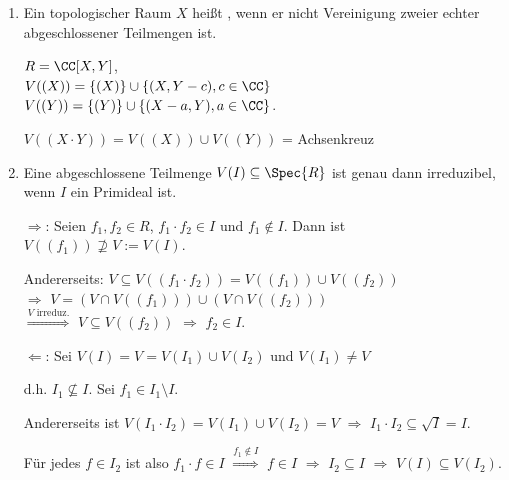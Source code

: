 \begin{DefProp}

\begin{enumerate}
\item Ein topologischer Raum $X$ heißt , wenn er nicht Vereinigung zweier echter abgeschlossener Teilmengen ist.

\begin{nnBsp}
$R = \CC[X,Y]$,\\
$V((X)) = \{ (X) \} \cup \{ (X, Y - c), c \in \CC \}$\\
$V((Y)) = \{ (Y) \} \cup \{ (X -a, Y), a \in \CC \}$.

$V((X \cdot Y)) = V( (X) ) \cup V( (Y) )$ = Achsenkreuz
\end{nnBsp}

\item Eine abgeschlossene Teilmenge $V(I) \subseteq \Spec{R}$ ist genau dann irreduzibel, wenn $I$ ein Primideal ist.

\begin{Bew}
\glqq$\Rightarrow$\grqq: Seien $f_1, f_2 \in R$, $f_1 \cdot f_2 \in I$ und $f_1 \notin I$. Dann ist $V((f_1)) \nsupseteq V := V(I)$.

Andererseits: $V \subseteq V((f_1 \cdot f_2)) = V((f_1)) \cup V((f_2))$\\
$\Rightarrow$ $V = (V \cap V((f_1))) \cup (V \cap V((f_2)))$\\
$\overset{V \text{ irreduz.}}\Rightarrow$ $V \subseteq V((f_2))$ $\Rightarrow$ $f_2 \in I$.

\glqq$\Leftarrow$\grqq: Sei $V(I) = V = V(I_1) \cup V(I_2)$ und $V(I_1) \neq V$

d.h. $I_1 \nsubseteq I$. Sei $f_1 \in I_1 \setminus I$.

Andererseits ist $V(I_1 \cdot I_2) = V(I_1) \cup V(I_2) = V$ $\Rightarrow$ $I_1 \cdot I_2 \subseteq \sqrt{I} = I$.

F\"ur jedes $f \in I_2$ ist also $f_1 \cdot f \in I$ $\overset{f_1 \notin I}\Rightarrow$ $f \in I$ $\Rightarrow$ $I_2 \subseteq I$ $\Rightarrow$ $V(I) \subseteq V(I_2)$.

\end{Bew}

\end{enumerate}

\end{DefProp}

